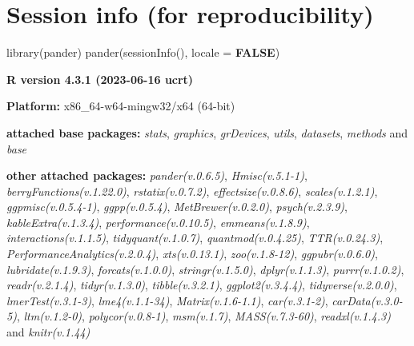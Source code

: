 \documentclass[
  bookmarksnumbered]{article}
\newenvironment{Shaded}{\begin{snugshade}}{\end{snugshade}}
\newcommand{\AttributeTok}[1]{\textcolor[rgb]{0.80,0.80,0.80}{#1}}
\newcommand{\ConstantTok}[1]{\textcolor[rgb]{0.86,0.64,0.64}{\textbf{#1}}}
\newcommand{\FunctionTok}[1]{\textcolor[rgb]{0.94,0.94,0.56}{#1}}
\newcommand{\NormalTok}[1]{\textcolor[rgb]{0.80,0.80,0.80}{#1}}
\begin{document}
\hypertarget{session}{%
\section{Session info (for reproducibility)}\label{session}}

\begin{Shaded}
\begin{Highlighting}[]
\FunctionTok{library}\NormalTok{(pander)}
\FunctionTok{pander}\NormalTok{(}\FunctionTok{sessionInfo}\NormalTok{(), }\AttributeTok{locale =} \ConstantTok{FALSE}\NormalTok{)}
\end{Highlighting}
\end{Shaded}

\textbf{R version 4.3.1 (2023-06-16 ucrt)}

\textbf{Platform:} x86\_64-w64-mingw32/x64 (64-bit)

\textbf{attached base packages:}
\emph{stats}, \emph{graphics}, \emph{grDevices}, \emph{utils}, \emph{datasets}, \emph{methods} and \emph{base}

\textbf{other attached packages:}
\emph{pander(v.0.6.5)}, \emph{Hmisc(v.5.1-1)}, \emph{berryFunctions(v.1.22.0)}, \emph{rstatix(v.0.7.2)}, \emph{effectsize(v.0.8.6)}, \emph{scales(v.1.2.1)}, \emph{ggpmisc(v.0.5.4-1)}, \emph{ggpp(v.0.5.4)}, \emph{MetBrewer(v.0.2.0)}, \emph{psych(v.2.3.9)}, \emph{kableExtra(v.1.3.4)}, \emph{performance(v.0.10.5)}, \emph{emmeans(v.1.8.9)}, \emph{interactions(v.1.1.5)}, \emph{tidyquant(v.1.0.7)}, \emph{quantmod(v.0.4.25)}, \emph{TTR(v.0.24.3)}, \emph{PerformanceAnalytics(v.2.0.4)}, \emph{xts(v.0.13.1)}, \emph{zoo(v.1.8-12)}, \emph{ggpubr(v.0.6.0)}, \emph{lubridate(v.1.9.3)}, \emph{forcats(v.1.0.0)}, \emph{stringr(v.1.5.0)}, \emph{dplyr(v.1.1.3)}, \emph{purrr(v.1.0.2)}, \emph{readr(v.2.1.4)}, \emph{tidyr(v.1.3.0)}, \emph{tibble(v.3.2.1)}, \emph{ggplot2(v.3.4.4)}, \emph{tidyverse(v.2.0.0)}, \emph{lmerTest(v.3.1-3)}, \emph{lme4(v.1.1-34)}, \emph{Matrix(v.1.6-1.1)}, \emph{car(v.3.1-2)}, \emph{carData(v.3.0-5)}, \emph{ltm(v.1.2-0)}, \emph{polycor(v.0.8-1)}, \emph{msm(v.1.7)}, \emph{MASS(v.7.3-60)}, \emph{readxl(v.1.4.3)} and \emph{knitr(v.1.44)}
\end{document}
